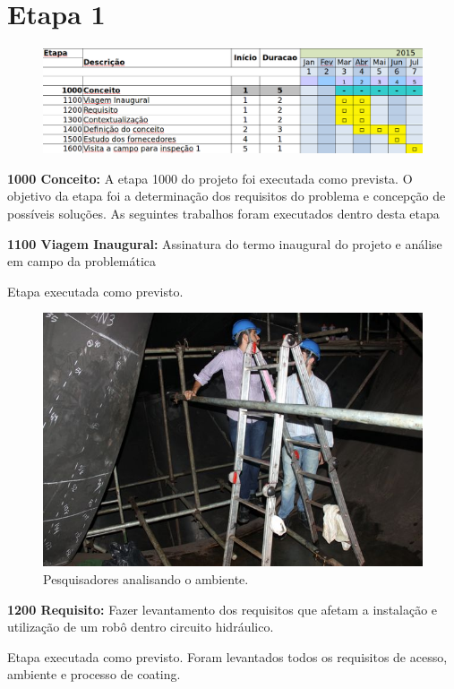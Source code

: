 

\section{Etapa 1}

\begin{figure}
\centering
\includegraphics[width=0.9\columnwidth]{figs/etapa1}
\end{figure} 

\textbf{1000 Conceito:} A etapa 1000 do projeto foi executada como prevista. O
objetivo da etapa foi a determinação dos requisitos do problema e concepção de
possíveis soluções. As seguintes trabalhos foram executados dentro desta etapa

\textbf{1100 Viagem Inaugural:} Assinatura do termo inaugural do projeto e
análise em campo da problemática

Etapa executada como previsto. 

\begin{figure}
\centering
\includegraphics[width=0.9\columnwidth]{figs/img_4967}
\caption{Pesquisadores analisando o ambiente.}
\end{figure}


\textbf{1200 Requisito:} Fazer levantamento dos requisitos que afetam a
instalação e utilização de um robô dentro circuito hidráulico.

Etapa executada como previsto. Foram levantados todos os requisitos de acesso,
ambiente e processo de coating.

